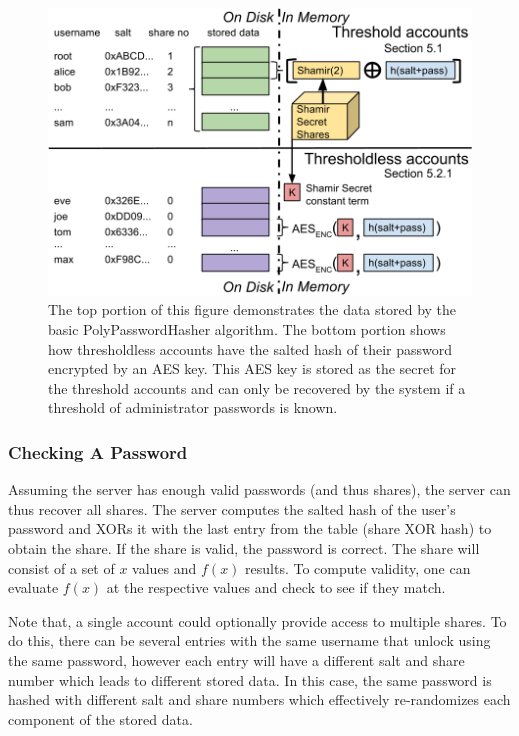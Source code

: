 \begin{figure}
\center
\begin{minipage}[b]{1.05\linewidth}
\includegraphics[width=\columnwidth]{figures/polypasswordhasheroverview.png}
\end{minipage}
\caption{The top portion of this figure demonstrates the data stored
by the basic PolyPasswordHasher algorithm.   The bottom portion shows how
thresholdless accounts have the salted hash of their password
encrypted by an AES key.   This AES key is stored as the secret for the 
threshold accounts and can only be recovered by the system if a threshold
of administrator passwords is known.}
\label{fig-polypasswordhasheroverview}
\end{figure}


\subsubsection{Checking A Password}

Assuming the server has enough valid passwords (and thus shares), the server 
can thus recover all shares.
The server computes the salted hash of the user's password and
XORs it with the last entry from the table (share XOR hash) to obtain 
the share.   If the share is valid, the password is correct.   The share will
consist of a set of $x$ values and $f(x)$ results.   To compute validity, 
one can evaluate $f(x)$ at the respective values and check to see if they
match.

Note that, a single account could optionally provide access 
to multiple shares.
To do this, there can be several entries with the same username that unlock 
using the same password, however each entry will have a different
salt and share number which leads to different stored data.   In this
case, the same password is hashed with different salt
and share numbers which effectively re-randomizes each component of
the stored data.

